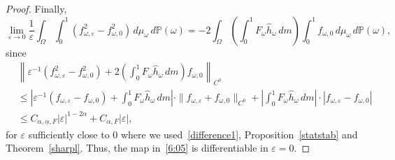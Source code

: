 \documentclass[12pt,reqno,a4paper]{article}
\newtheorem{lemma}[theorem]{Lemma}
\begin{document}
\begin{proof}
	Finally, 
	\[
	\lim_{\varepsilon \to 0}\frac{1}{\varepsilon}\int_\Omega\int_0^1 (f_{\omega, \varepsilon}^2-f_{\omega, 0}^2)\, d\mu_{\omega}\, d\mathbb P(\omega)=-2\int_\Omega \left (\int_0^1F_\omega \hat h_\omega\, dm\right )\int_0^1 f_{\omega, 0}\, d\mu_\omega\, d\mathbb P(\omega),
	\]
	since 
	\[
	\begin{split}
		&\left \|\varepsilon^{-1}(f_{\omega, \varepsilon}^2-f_{\omega, 0}^2)+2\left  (\int_0^1F_\omega \hat h_\omega\, dm\right )f_{\omega, 0} \right \|_{C^0} \\
		&\le \left |\varepsilon^{-1}(f_{\omega, \varepsilon}-f_{\omega, 0})+\int_0^1 F_\omega \hat h_\omega\, dm\right | \cdot \|f_{\omega, \varepsilon}+f_{\omega, 0}\|_{C^0}+\left |\int_0^1 F_\omega \hat h_\omega \, dm\right | \cdot |f_{\omega, \varepsilon}-f_{\omega, 0}| \\
		&\le C_{\alpha, \underline{\alpha}, F}|\varepsilon|^{1-2\alpha}+C_{\alpha, F} |\varepsilon|,
	\end{split}
	\]
	for $\varepsilon$ sufficiently close to $0$ where we used~\eqref{difference1}, Proposition~\ref{statstab} and Theorem~\ref{sharpl}.
	Thus, the map in~\eqref{6:05} is differentiable in $\varepsilon=0$.
\end{proof}









\end{document}
